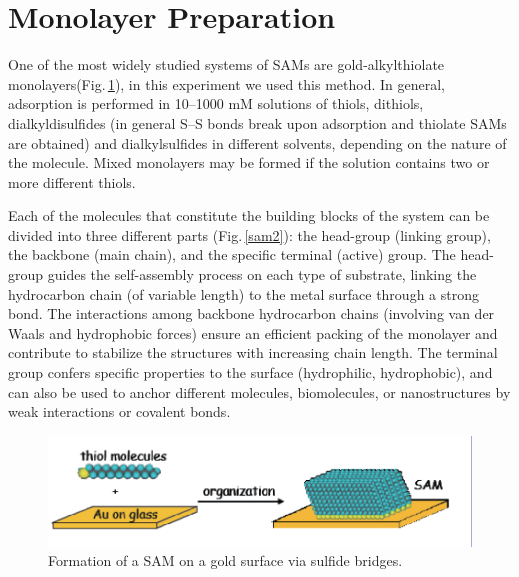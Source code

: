 \section{Monolayer Preparation}

One of the most widely studied systems of SAMs are gold-alkylthiolate monolayers(Fig.\,\ref{sam1}), in this experiment we used this method.
In general, adsorption is performed in 10–1000 mM solutions of thiols, dithiols,
dialkyldisulfides (in general S–S bonds break upon adsorption and thiolate SAMs are obtained) and dialkylsulfides in different solvents, depending on the nature of the molecule. Mixed monolayers may be formed if the solution contains two or more different thiols.

Each of the molecules that constitute the building blocks of the system can be
divided into three different parts (Fig.\,\ref{sam2}):
the head-group (linking group), the backbone (main chain), and the specific terminal (active) group. The head-group guides the self-assembly process on each type of substrate, linking the hydrocarbon chain (of variable length) to the metal surface through a strong bond.
The interactions among backbone hydrocarbon chains (involving van der Waals and hydrophobic forces) ensure an efficient packing of the monolayer and contribute to stabilize the structures with increasing chain length.
The terminal group confers specific properties to the surface (hydrophilic, hydrophobic), and can also be used to anchor different molecules, biomolecules, or nanostructures by weak interactions or covalent bonds.


\begin{figure}[h]
\centering
\includegraphics[width=0.6\columnwidth]{sam.eps}
\caption{Formation of a SAM on a gold surface via sulfide bridges.}
\label{sam1}
\end{figure}

